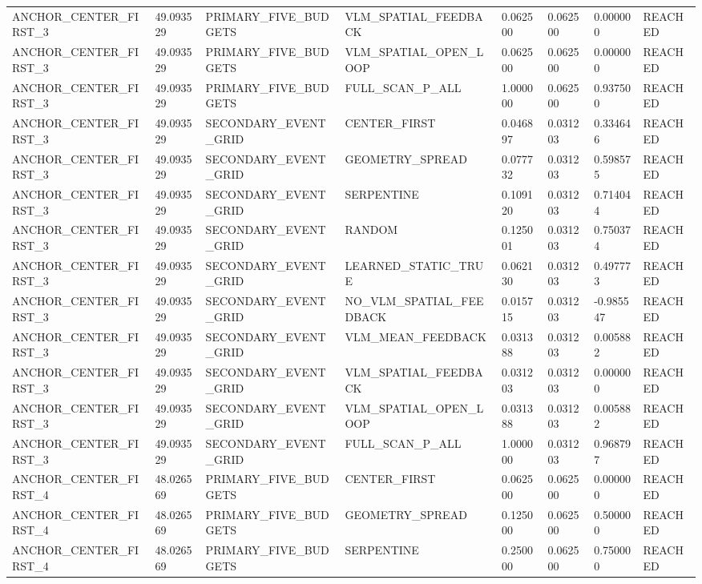\begin{tabular}{llllllll}
ANCHOR\_CENTER\_FIRST\_3 & 49.093529 & PRIMARY\_FIVE\_BUDGETS & VLM\_SPATIAL\_FEEDBACK & 0.062500 & 0.062500 & 0.000000 & REACHED \\
ANCHOR\_CENTER\_FIRST\_3 & 49.093529 & PRIMARY\_FIVE\_BUDGETS & VLM\_SPATIAL\_OPEN\_LOOP & 0.062500 & 0.062500 & 0.000000 & REACHED \\
ANCHOR\_CENTER\_FIRST\_3 & 49.093529 & PRIMARY\_FIVE\_BUDGETS & FULL\_SCAN\_P\_ALL & 1.000000 & 0.062500 & 0.937500 & REACHED \\
ANCHOR\_CENTER\_FIRST\_3 & 49.093529 & SECONDARY\_EVENT\_GRID & CENTER\_FIRST & 0.046897 & 0.031203 & 0.334646 & REACHED \\
ANCHOR\_CENTER\_FIRST\_3 & 49.093529 & SECONDARY\_EVENT\_GRID & GEOMETRY\_SPREAD & 0.077732 & 0.031203 & 0.598575 & REACHED \\
ANCHOR\_CENTER\_FIRST\_3 & 49.093529 & SECONDARY\_EVENT\_GRID & SERPENTINE & 0.109120 & 0.031203 & 0.714044 & REACHED \\
ANCHOR\_CENTER\_FIRST\_3 & 49.093529 & SECONDARY\_EVENT\_GRID & RANDOM & 0.125001 & 0.031203 & 0.750374 & REACHED \\
ANCHOR\_CENTER\_FIRST\_3 & 49.093529 & SECONDARY\_EVENT\_GRID & LEARNED\_STATIC\_TRUE & 0.062130 & 0.031203 & 0.497773 & REACHED \\
ANCHOR\_CENTER\_FIRST\_3 & 49.093529 & SECONDARY\_EVENT\_GRID & NO\_VLM\_SPATIAL\_FEEDBACK & 0.015715 & 0.031203 & -0.985547 & REACHED \\
ANCHOR\_CENTER\_FIRST\_3 & 49.093529 & SECONDARY\_EVENT\_GRID & VLM\_MEAN\_FEEDBACK & 0.031388 & 0.031203 & 0.005882 & REACHED \\
ANCHOR\_CENTER\_FIRST\_3 & 49.093529 & SECONDARY\_EVENT\_GRID & VLM\_SPATIAL\_FEEDBACK & 0.031203 & 0.031203 & 0.000000 & REACHED \\
ANCHOR\_CENTER\_FIRST\_3 & 49.093529 & SECONDARY\_EVENT\_GRID & VLM\_SPATIAL\_OPEN\_LOOP & 0.031388 & 0.031203 & 0.005882 & REACHED \\
ANCHOR\_CENTER\_FIRST\_3 & 49.093529 & SECONDARY\_EVENT\_GRID & FULL\_SCAN\_P\_ALL & 1.000000 & 0.031203 & 0.968797 & REACHED \\
ANCHOR\_CENTER\_FIRST\_4 & 48.026569 & PRIMARY\_FIVE\_BUDGETS & CENTER\_FIRST & 0.062500 & 0.062500 & 0.000000 & REACHED \\
ANCHOR\_CENTER\_FIRST\_4 & 48.026569 & PRIMARY\_FIVE\_BUDGETS & GEOMETRY\_SPREAD & 0.125000 & 0.062500 & 0.500000 & REACHED \\
ANCHOR\_CENTER\_FIRST\_4 & 48.026569 & PRIMARY\_FIVE\_BUDGETS & SERPENTINE & 0.250000 & 0.062500 & 0.750000 & REACHED \\

\end{tabular}

